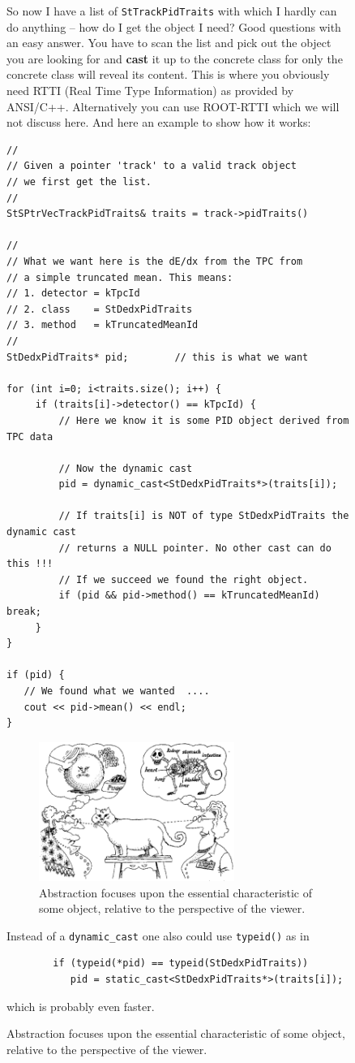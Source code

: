 \documentclass[twoside]{article}
\begin{document}
\begin{figure}[htb]
\begin{center}
So now I have a list of \texttt{StTrackPidTraits} with which I hardly
can do anything -- how do I get the object I need? Good questions with
an easy answer. You have to scan the list and pick out the object you
are looking for and \textbf{cast} it up to the concrete class for only
the concrete class will reveal its content.  This is where you
obviously need RTTI (Real Time Type Information) as provided by
ANSI/C++. Alternatively you can use ROOT-RTTI which we will not
discuss here.  And here an example to show how it works:
\begin{verbatim}
//
// Given a pointer 'track' to a valid track object
// we first get the list.
//
StSPtrVecTrackPidTraits& traits = track->pidTraits()

//
// What we want here is the dE/dx from the TPC from
// a simple truncated mean. This means:
// 1. detector = kTpcId
// 2. class    = StDedxPidTraits
// 3. method   = kTruncatedMeanId
//
StDedxPidTraits* pid;        // this is what we want

for (int i=0; i<traits.size(); i++) {
     if (traits[i]->detector() == kTpcId) {
         // Here we know it is some PID object derived from TPC data

         // Now the dynamic cast
         pid = dynamic_cast<StDedxPidTraits*>(traits[i]);

         // If traits[i] is NOT of type StDedxPidTraits the dynamic cast
         // returns a NULL pointer. No other cast can do this !!!
         // If we succeed we found the right object.
         if (pid && pid->method() == kTruncatedMeanId) break;
     }
}

if (pid) {
   // We found what we wanted  ....
   cout << pid->mean() << endl;
}
\end{verbatim}
\begin{figure}[htb]
    \begin{center}
        \includegraphics[width=0.7\textwidth]{cartoon5.eps}
        \caption{Abstraction focuses upon the essential characteristic
            of some object, relative to the perspective of the
            viewer.}
    \end{center}
\end{figure}
Instead of a \texttt{dynamic\_cast} one also could use
\texttt{typeid()} as in
\begin{verbatim}
        if (typeid(*pid) == typeid(StDedxPidTraits))
           pid = static_cast<StDedxPidTraits*>(traits[i]);
\end{verbatim}
which is probably even faster.


\end{center}
\end{figure}
\end{document}
